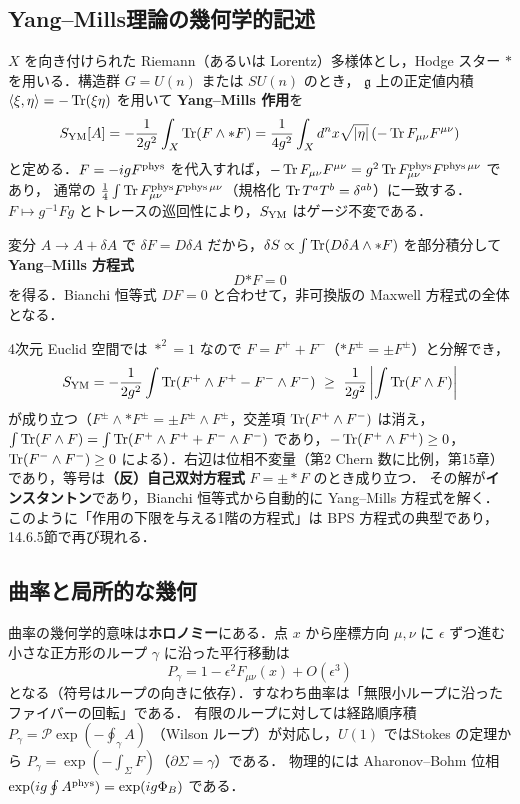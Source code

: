 \subsection{Yang--Mills理論の幾何学的記述}

$X$ を向き付けられた Riemann（あるいは Lorentz）多様体とし，Hodge スター $*$ を用いる．構造群 $G=U(n)$ または $SU(n)$ のとき，
$\mathfrak{g}$ 上の正定値内積 $\langle\xi,\eta\rangle=-\operatorname{Tr}(\xi\eta)$ を用いて \textbf{Yang--Mills 作用}を
\begin{equation}
  S_{\rm YM}[A] = -\frac{1}{2g^2}\int_X\operatorname{Tr}(F\wedge *F) = \frac{1}{4g^2}\int_X d^nx\sqrt{|\eta|}\,(-\operatorname{Tr} F_{\mu\nu}F^{\mu\nu})
\end{equation}
と定める．$F=-igF^{\rm phys}$ を代入すれば，$-\operatorname{Tr} F_{\mu\nu}F^{\mu\nu}=g^2\operatorname{Tr} F^{\rm phys}_{\mu\nu}F^{{\rm phys}\,\mu\nu}$ であり，
通常の $\frac14\int\operatorname{Tr} F^{\rm phys}_{\mu\nu}F^{{\rm phys}\,\mu\nu}$（規格化 $\operatorname{Tr} T^aT^b=\delta^{ab}$）に一致する．
$F\mapsto g^{-1}Fg$ とトレースの巡回性により，$S_{\rm YM}$ はゲージ不変である．

変分 $A\to A+\delta A$ で $\delta F = D\delta A$ だから，$\delta S \propto \int\operatorname{Tr}(D\delta A\wedge *F)$ を部分積分して
\textbf{Yang--Mills 方程式}
\begin{equation}
  D{*F} = 0
\end{equation}
を得る．Bianchi 恒等式 $DF=0$ と合わせて，非可換版の Maxwell 方程式の全体となる．

4次元 Euclid 空間では $*^2=1$ なので $F=F^++F^-$（$*F^\pm=\pm F^\pm$）と分解でき，
\begin{equation}
  S_{\rm YM} = -\frac{1}{2g^2}\int\Tr(F^+\wedge F^+ - F^-\wedge F^-)\ \geq\ \frac{1}{2g^2}\left|\int\Tr(F\wedge F)\right|
\end{equation}
が成り立つ（$F^\pm\wedge *F^\pm = \pm F^\pm\wedge F^\pm$，交差項 $\operatorname{Tr}(F^+\wedge F^-)$ は消え，$\int\operatorname{Tr}(F\wedge F)=\int\operatorname{Tr}(F^+\wedge F^+ + F^-\wedge F^-)$ であり，$-\operatorname{Tr}(F^+\wedge F^+)\geq0$，$\operatorname{Tr}(F^-\wedge F^-)\geq0$ による）．右辺は位相不変量（第2 Chern 数に比例，第15章）であり，等号は\textbf{（反）自己双対方程式} $F=\pm*F$ のとき成り立つ．
その解が\textbf{インスタントン}であり，Bianchi 恒等式から自動的に Yang--Mills 方程式を解く．
このように「作用の下限を与える1階の方程式」は BPS 方程式の典型であり，14.6.5節で再び現れる．

\subsection{曲率と局所的な幾何}

曲率の幾何学的意味は\textbf{ホロノミー}にある．点 $x$ から座標方向 $\mu,\nu$ に $\epsilon$ ずつ進む小さな正方形のループ $\gamma$ に沿った平行移動は
\begin{equation}
  P_\gamma = 1 - \epsilon^2 F_{\mu\nu}(x) + O(\epsilon^3)
\end{equation}
となる（符号はループの向きに依存）．すなわち曲率は「無限小ループに沿ったファイバーの回転」である．
有限のループに対しては経路順序積
$P_\gamma = \mathcal{P}\exp\left(-\oint_\gamma A\right)$
（Wilson ループ）が対応し，$U(1)$ ではStokes の定理から $P_\gamma = \exp(-\int_\Sigma F)$（$\partial\Sigma=\gamma$）である．
物理的には Aharonov--Bohm 位相 $\exp(ig\oint A^{\rm phys})=\exp(ig\Phi_B)$ である．

